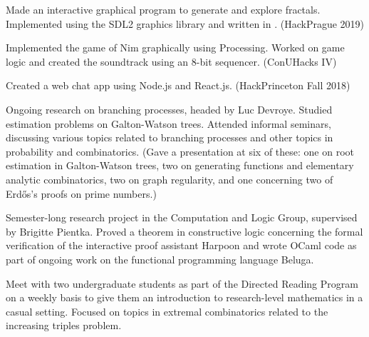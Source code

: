 \medbreak

\smallskip
Made an interactive graphical program to generate and explore fractals. Implemented using the SDL2
graphics library and written in \CEE. (HackPrague 2019)

\medbreak

\smallskip
Implemented the game of Nim graphically using Processing. Worked on game logic and created the soundtrack
using an $8$-bit sequencer. (ConUHacks IV)

\medbreak

\smallskip
Created a web chat app using Node.js and React.js. (HackPrinceton Fall 2018)

\medbreak


\smallskip
Ongoing research on branching processes, headed by Luc Devroye. Studied estimation problems
on Galton-Watson trees. Attended informal seminars, discussing
various topics related to branching
processes and other topics in probability and combinatorics.
(Gave a presentation at six of these: one on root estimation in Galton-Watson
trees, two on generating functions and elementary analytic combinatorics, two on graph regularity, and
one concerning two of Erd\H os's proofs on prime numbers.)
\medbreak

\smallskip
Semester-long research project in the Computation and Logic Group, supervised
by Brigitte Pientka.
Proved a theorem in constructive logic concerning the formal verification
of the interactive proof assistant Harpoon and wrote OCaml code as part of
ongoing work on the functional programming language Beluga.
\medbreak


\smallskip
Meet with two undergraduate students as part of the Directed Reading Program
on a weekly basis to give them an introduction to research-level
mathematics in a casual setting. Focused on topics in extremal combinatorics related to the increasing
triples problem.
\medbreak

